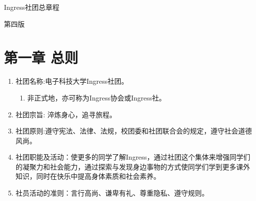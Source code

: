 \documentclass[a4paper]{article}
\title{}
\author{Charles Yang}
\date{2018-03-28}
\newcommand\liststyleWWNumv{%
\renewcommand\theenumi{\arabic{enumi}}
\renewcommand\theenumii{\arabic{enumi}.\arabic{enumii}}
\renewcommand\theenumiii{\arabic{enumi}.\arabic{enumii}.\arabic{enumiii}}
\renewcommand\theenumiv{\arabic{enumi}.\arabic{enumii}.\arabic{enumiii}.\arabic{enumiv}}
\renewcommand\labelenumi{\theenumi.}
\renewcommand\labelenumii{\theenumii.}
\renewcommand\labelenumiii{\theenumiii.}
\renewcommand\labelenumiv{\theenumiv.}
}
\begin{document}
\clearpage\setcounter{page}{1}\pagestyle{Standard}
{\centering
	{\Large Ingress社团总章程}
\par}


{\centering\color[rgb]{0.4,0.4,0.4}
第四版
\par}

\section[第一章 总则]{第一章 总则}
\liststyleWWNumv
\begin{enumerate}
\item 社团名称:电子科技大学Ingress社团。

\begin{enumerate}
\item 非正式地，亦可称为Ingress协会或Ingress社。
\end{enumerate}
\item 社团宗旨: 淬炼身心，追寻旅程。
\item 社团原则:遵守宪法、法律、法规，校团委和社团联合会的规定，遵守社会道德风尚。
\item 社团职能及活动：使更多的同学了解Ingress，通过社团这个集体来增强同学们的凝聚力和社会能力，通过探索与发现身边事物的方式使同学们学到更多课外知识，同时在快乐中提高身体素质和社会素养。
\item 社员活动的准则：言行高尚、谦卑有礼、尊重隐私、遵守规则。
\end{enumerate}

\bigskip
\end{document}
